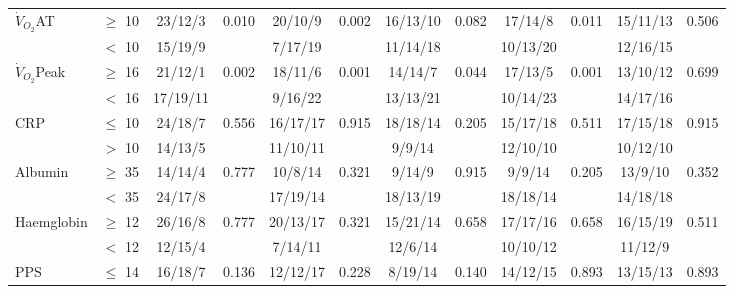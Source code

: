 \begin{sidewaystable}[p]
\begin{tabular}{|l l| c c | c c| c c | c c |c c |}
		$\dot{V}_{O_2}$AT   & $\geq$ 10 & 23/12/3         & 0.010       & 20/10/9      & 0.002          & 16/13/10     & 0.082                  & 17/14/8      & 0.011             & 15/11/13     & 0.506                \\
		                    & $<$ 10    & 15/19/9         &             & 7/17/19      &                & 11/14/18     &                        & 10/13/20     &                   & 12/16/15     &  \\ \hline
		$\dot{V}_{O_2}$Peak & $\geq$ 16 & 21/12/1         & 0.002       & 18/11/6      & 0.001          & 14/14/7      & 0.044                  & 17/13/5      & 0.001             & 13/10/12     & 0.699                \\
		                    & $<$ 16    & 17/19/11        &             & 9/16/22      &                & 13/13/21     &                        & 10/14/23     &                   & 14/17/16     &  \\ \hline
		CRP                 & $\leq$ 10 & 24/18/7         & 0.556       & 16/17/17     & 0.915          & 18/18/14     & 0.205                  & 15/17/18     & 0.511             & 17/15/18     & 0.915                \\
		                    & $>$ 10    & 14/13/5         &             & 11/10/11     &                & 9/9/14       &                        & 12/10/10     &                   & 10/12/10     &  \\ \hline
		Albumin             & $\geq$ 35 & 14/14/4         & 0.777       & 10/8/14      & 0.321          & 9/14/9       & 0.915                  & 9/9/14       & 0.205             & 13/9/10      & 0.352                \\
		                    & $<$ 35    & 24/17/8         &             & 17/19/14     &                & 18/13/19     &                        & 18/18/14     &                   & 14/18/18     &  \\ \hline
		Haemglobin          & $\geq$ 12 & 26/16/8         & 0.777       & 20/13/17     & 0.321          & 15/21/14     & 0.658                  & 17/17/16     & 0.658             & 16/15/19     & 0.511                \\
		                    & $<$ 12    & 12/15/4         &             & 7/14/11      &                & 12/6/14      &                        & 10/10/12     &                   & 11/12/9      &  \\ \hline
		PPS                 & $\leq$ 14 & 16/18/7         & 0.136       & 12/12/17     & 0.228          & 8/19/14      & 0.140                  & 14/12/15     & 0.893             & 13/15/13     & 0.893                \\

\end{tabular}
\end{sidewaystable}

